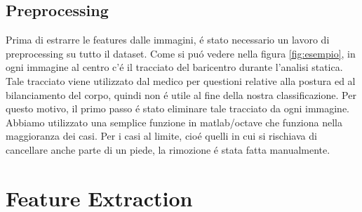 \documentclass[11pt,a4paper]{article}
\begin{document}
\subsection{Preprocessing}

Prima di estrarre le features dalle immagini, \'e stato necessario un lavoro di preprocessing su tutto il dataset. Come si pu\'o vedere nella figura \ref{fig:esempio}, in ogni immagine al centro c'\'e il tracciato del baricentro durante l'analisi statica. Tale tracciato viene utilizzato dal medico per questioni relative alla postura ed al bilanciamento del corpo, quindi non \'e utile al fine della nostra classificazione. Per questo motivo, il primo passo \'e stato eliminare tale tracciato da ogni immagine. Abbiamo utilizzato una semplice funzione in matlab/octave che funziona nella maggioranza dei casi. Per i casi al limite, cio\'e quelli in cui si rischiava di cancellare anche parte di un piede, la rimozione \'e stata fatta manualmente.



\section{Feature Extraction}
\label{sec:implementation}
\end{document}
